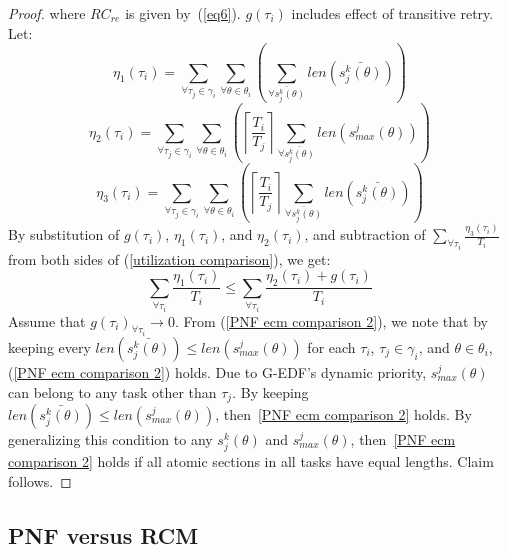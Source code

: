 \begin{proof}
%
where $RC_{re}$ is given by~(\ref{eq6}). $g(\tau_i)$ includes effect of transitive retry. Let:
%
\begin{equation*}
\eta_{1}(\tau_{i})=\sum_{\forall\tau_{j}\in\gamma_{i}}\sum_{\forall\theta\in\theta_{i}}\left(\sum_{\bar{\forall s_{j}^{k}(\theta)}}len\left(\bar{s_{j}^{k}(\theta)}\right)\right)
\end{equation*}
%
\begin{equation*}
\eta_{2}(\tau_{i})=\sum_{\forall\tau_{j}\in\gamma_{i}}\sum_{\forall\theta\in\theta_{i}}\left(\left\lceil \frac{T_{i}}{T_{j}}\right\rceil \sum_{\forall\bar{s_{j}^{k}(\theta)}}len\left(s_{max}^{j}(\theta)\right)\right)
\end{equation*}
%
%
\begin{equation*}
\eta_{3}(\tau_{i})=\sum_{\forall\tau_{j}\in\gamma_{i}}\sum_{\forall\theta\in\theta_{i}}\left(\left\lceil \frac{T_{i}}{T_{j}}\right\rceil \sum_{\bar{\forall s_{j}^{k}(\theta)}}len\left(\bar{s_{j}^{k}(\theta)}\right)\right)
\end{equation*}
%
By substitution of $g(\tau_{i})$, $\eta_1(\tau_i)$, and $\eta_2(\tau_i)$, and subtraction of $\sum_{\forall \tau_i} \frac{\eta_3(\tau_i)}{T_i}$ from both sides of (\ref{utilization comparison}), we get: 
\begin{equation}
\sum_{\forall \tau_i} \frac{\eta_1(\tau_i)}{T_i} \le \sum_{\forall \tau_i} \frac{\eta_2(\tau_i)+g(\tau_i)}{T_i}
\label{PNF ecm comparison 2}
\end{equation}
Assume that $g(\tau_{i})_{\forall\tau_{i}}\rightarrow0$. From (\ref{PNF ecm comparison 2}), we note that by keeping
every $len(\bar{s_{j}^{k}(\theta)})\le len(s_{max}^{j}(\theta))$
for each $\tau_{i}$, $\tau_{j}\in\gamma_{i}$, and $\theta\in\theta_{i}$,  (\ref{PNF ecm comparison 2}) holds. 
%
Due to G-EDF's dynamic priority, $s_{max}^{j}(\theta)$
can belong to any task other than $\tau_{j}$. By keeping $len(\bar{s_j^k(\theta)})\le len(s_{max}^j(\theta))$, then~\ref{PNF ecm comparison 2} holds. By generalizing this condition to any $s_j^k(\theta)$ and $s_{max}^j(\theta)$, then~\ref{PNF ecm comparison 2} holds if all atomic sections in all tasks have equal lengths. Claim follows.
\end{proof}

\subsection{PNF versus RCM}\label{pnf vs rcm sec}

